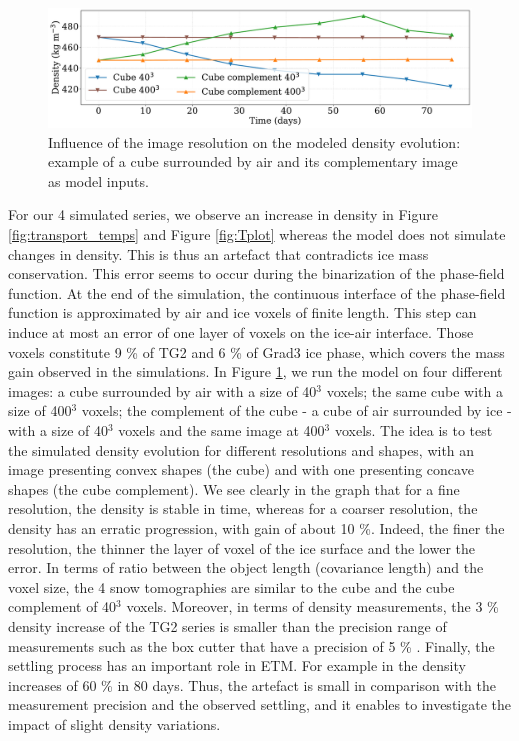 \documentclass[draft,ms]{agujournal2019}
\begin{document}
\begin{figure}
    \centering
    \includegraphics[width=0.9\linewidth]{Figures/cubes_compl_density_propre.pdf}
    \caption{Influence of the image resolution on the modeled density evolution: example of a cube surrounded by air and its complementary image as model inputs.}
    \label{fig:cubes}
\end{figure}

For our 4 simulated series, we observe an increase in density in Figure \ref{fig:transport_temps} and Figure \ref{fig:Tplot} whereas the model does not simulate changes in density. This is thus an artefact that contradicts ice mass conservation. This error seems to occur during the binarization of the phase-field function. At the end of the simulation, the continuous interface of the phase-field function is approximated by air and ice voxels of finite length. This step can induce at most an error of one layer of voxels on the ice-air interface. Those voxels constitute 9 \% of TG2 and 6 \% of Grad3 ice phase, which covers the mass gain observed in the simulations. In Figure \ref{fig:cubes}, we run the model on four different images: a cube surrounded by air with a size of 40$^3$ voxels; the same cube with a size of 400$^3$ voxels; the complement of the cube - a cube of air surrounded by ice - with a size of 40$^3$ voxels and the same image at 400$^3$ voxels. The idea is to test the simulated density evolution for different resolutions and shapes, with an image presenting convex shapes (the cube) and with one presenting concave shapes (the cube complement). We see clearly in the graph that for a fine resolution, the density is stable in time, whereas for a coarser resolution, the density has an erratic progression, with gain of about 10 \%. Indeed, the finer the resolution, the thinner the layer of voxel of the ice surface and the lower the error. In terms of ratio between the object length (covariance length) and the voxel size, the 4 snow tomographies are similar to the cube and the cube complement of 40$^3$ voxels. %
Moreover, in terms of density measurements, the 3 \% density increase of the TG2 series is smaller than the precision range of measurements such as the box cutter that have a precision of 5 \% \cite{proksch2016intercomparison}. Finally, the settling process has an important role in ETM. For example in  the density increases of 60 \% in 80 days. Thus, the artefact is small in comparison with the measurement precision and the observed settling, and it enables to investigate the impact of slight density variations.\\
\end{document}

